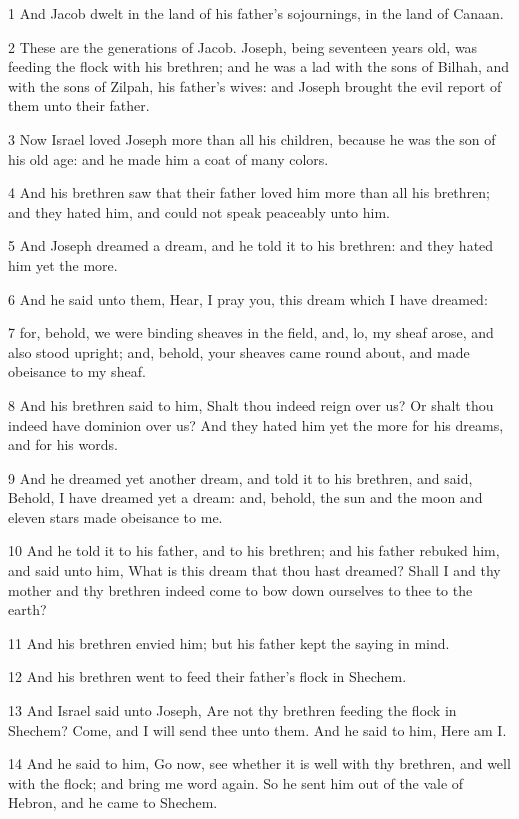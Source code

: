\par 1 And Jacob dwelt in the land of his father's sojournings, in the land of Canaan.
\par 2 These are the generations of Jacob. Joseph, being seventeen years old, was feeding the flock with his brethren; and he was a lad with the sons of Bilhah, and with the sons of Zilpah, his father's wives: and Joseph brought the evil report of them unto their father.
\par 3 Now Israel loved Joseph more than all his children, because he was the son of his old age: and he made him a coat of many colors.
\par 4 And his brethren saw that their father loved him more than all his brethren; and they hated him, and could not speak peaceably unto him.
\par 5 And Joseph dreamed a dream, and he told it to his brethren: and they hated him yet the more.
\par 6 And he said unto them, Hear, I pray you, this dream which I have dreamed:
\par 7 for, behold, we were binding sheaves in the field, and, lo, my sheaf arose, and also stood upright; and, behold, your sheaves came round about, and made obeisance to my sheaf.
\par 8 And his brethren said to him, Shalt thou indeed reign over us? Or shalt thou indeed have dominion over us? And they hated him yet the more for his dreams, and for his words.
\par 9 And he dreamed yet another dream, and told it to his brethren, and said, Behold, I have dreamed yet a dream: and, behold, the sun and the moon and eleven stars made obeisance to me.
\par 10 And he told it to his father, and to his brethren; and his father rebuked him, and said unto him, What is this dream that thou hast dreamed? Shall I and thy mother and thy brethren indeed come to bow down ourselves to thee to the earth?
\par 11 And his brethren envied him; but his father kept the saying in mind.
\par 12 And his brethren went to feed their father's flock in Shechem.
\par 13 And Israel said unto Joseph, Are not thy brethren feeding the flock in Shechem? Come, and I will send thee unto them. And he said to him, Here am I.
\par 14 And he said to him, Go now, see whether it is well with thy brethren, and well with the flock; and bring me word again. So he sent him out of the vale of Hebron, and he came to Shechem.
